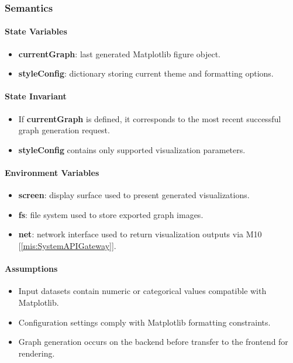 \documentclass[12pt, titlepage]{article}
\begin{document}
\begin{itemize}
  \subsubsection{Semantics}

  \paragraph{State Variables}
  \begin{itemize}
    \item \textbf{currentGraph}: last generated Matplotlib figure object.
    \item \textbf{styleConfig}: dictionary storing current theme and formatting options.
  \end{itemize}

  \paragraph{State Invariant}
  \begin{itemize}
    \item If \textbf{currentGraph} is defined, it corresponds to the most recent successful graph generation request.
    \item \textbf{styleConfig} contains only supported visualization parameters.
  \end{itemize}

  \paragraph{Environment Variables}
  \begin{itemize}
    \item \textbf{screen}: display surface used to present generated visualizations.
    \item \textbf{fs}: file system used to store exported graph images.
    \item \textbf{net}: network interface used to return visualization outputs via M10 [\ref{mis:SystemAPIGateway}].
  \end{itemize}

  \paragraph{Assumptions}
  \begin{itemize}
    \item Input datasets contain numeric or categorical values compatible with Matplotlib.
    \item Configuration settings comply with Matplotlib formatting constraints.
    \item Graph generation occurs on the backend before transfer to the frontend for rendering.
  \end{itemize}


\end{itemize}
\end{document}
